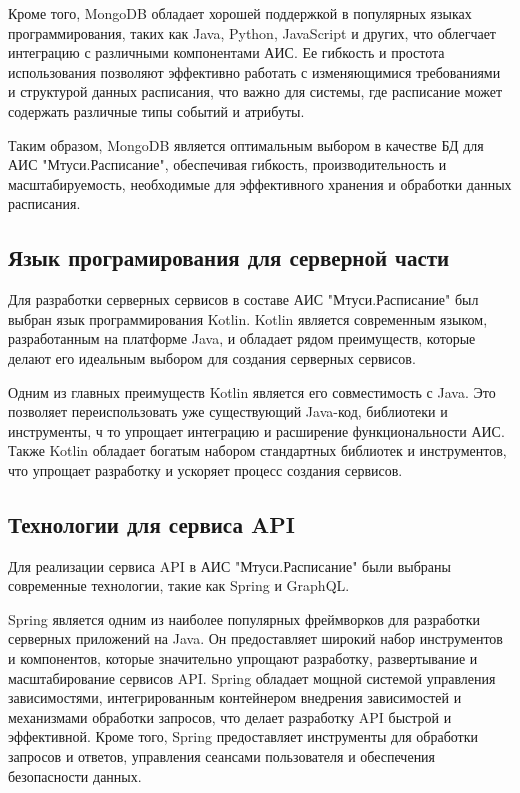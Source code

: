 Кроме того, MongoDB обладает хорошей поддержкой в популярных языках программирования,
таких как Java, Python, JavaScript и других, что облегчает интеграцию с различными компонентами АИС.
Ее гибкость и простота использования позволяют эффективно работать с изменяющимися
требованиями и структурой данных расписания, что важно для системы,
где расписание может содержать различные типы событий и атрибуты.

Таким образом, MongoDB является оптимальным выбором в
качестве БД для АИС "Мтуси.Расписание", обеспечивая гибкость, производительность
и масштабируемость, необходимые для эффективного хранения и обработки данных расписания.

\subsection{Язык програмирования для серверной части}
Для разработки серверных сервисов в составе АИС "Мтуси.Расписание" был выбран язык программирования Kotlin.
Kotlin является современным языком, разработанным на платформе Java, и обладает рядом преимуществ,
которые делают его идеальным выбором для создания серверных сервисов.

Одним из главных преимуществ Kotlin является его совместимость с Java.
Это позволяет переиспользовать уже существующий Java-код, библиотеки и инструменты, ч
то упрощает интеграцию и расширение функциональности АИС.
Также Kotlin обладает богатым набором стандартных библиотек и инструментов,
что упрощает разработку и ускоряет процесс создания сервисов.

\subsection{Технологии для сервиса API}
Для реализации сервиса API в АИС "Мтуси.Расписание" были выбраны современные технологии, такие как Spring и GraphQL.

Spring является одним из наиболее популярных фреймворков для разработки серверных приложений на Java.
Он предоставляет широкий набор инструментов и компонентов, которые значительно упрощают разработку,
развертывание и масштабирование сервисов API. Spring обладает мощной системой управления зависимостями,
интегрированным контейнером внедрения зависимостей и механизмами обработки запросов,
что делает разработку API быстрой и эффективной. Кроме того,
Spring предоставляет инструменты для обработки запросов и ответов, управления сеансами пользователя и обеспечения безопасности данных.

